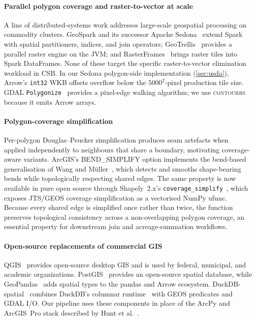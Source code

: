 \documentclass[preprint,12pt]{elsarticle}
\begin{document}
\paragraph{Parallel polygon coverage and raster-to-vector at scale}
A line of distributed-systems work addresses large-scale geospatial
processing on commodity clusters. GeoSpark and its successor Apache
Sedona~\cite{yu2019sedona} extend Spark with spatial partitioners,
indices, and join operators; GeoTrellis~\cite{geotrellis} provides a
parallel raster engine on the JVM; and RasterFrames~\cite{rasterframes}
brings raster tiles into Spark DataFrames. None of these target the
specific raster-to-vector elimination workload in CSB. In our Sedona
polygon-side implementation (\cref{sec:usda}), Arrow's \texttt{int32} WKB
offsets overflow below the $5000^2$-pixel production tile size. GDAL
\texttt{Polygonize}~\cite{gdal} provides a pixel-edge walking algorithm; we
use \textsc{contourrs}~\cite{contourrs} because it emits Arrow arrays.

\paragraph{Polygon-coverage simplification}
Per-polygon Douglas--Peucker simplification produces seam artefacts when
applied independently to neighbours that share a boundary, motivating
coverage-aware variants. ArcGIS's \textsc{BEND\_SIMPLIFY} option
implements the bend-based generalisation of Wang and
M\"uller~\cite{wang1998bend}, which detects and smooths shape-bearing
bends while topologically respecting shared edges. The same property
is now available in pure open source through Shapely~2.x's
\texttt{coverage\_simplify}~\cite{shapely,gillies2024shapely2}, which
exposes JTS/GEOS coverage simplification as a vectorised NumPy ufunc.
Because every shared edge is simplified once rather than twice, the
function preserves topological consistency across a non-overlapping
polygon coverage, an essential property for downstream join and
acreage-summation workflows.

\paragraph{Open-source replacements of commercial GIS}
QGIS~\cite{qgis2025patterns} provides open-source desktop GIS and is used by
federal, municipal, and academic organizations.
PostGIS~\cite{obe2021postgis} provides an open-source spatial database, while
GeoPandas~\cite{jordahl2020geopandas} adds spatial types to the pandas and
Arrow ecosystem. DuckDB-spatial~\cite{duckdbspatial} combines DuckDB's
columnar runtime~\cite{raasveldt2019duckdb} with GEOS predicates and GDAL I/O.
Our pipeline uses these components in place of the ArcPy and ArcGIS~Pro stack
described by Hunt et al.~\cite{hunt2024csb}.
\end{document}
